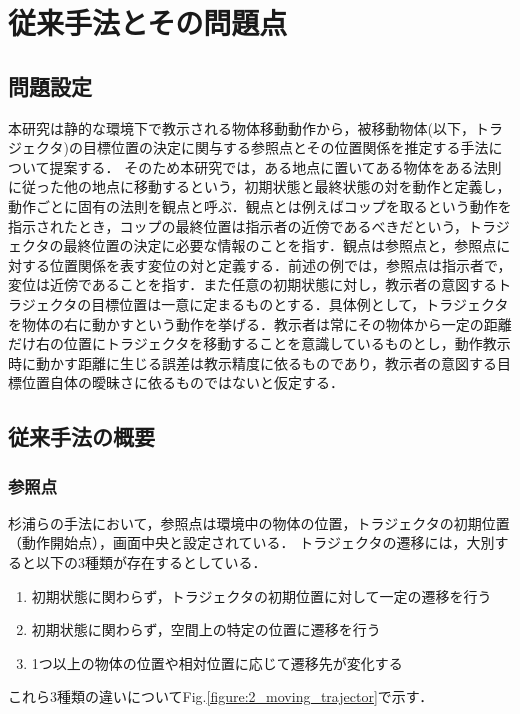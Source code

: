 ﻿%
\chapter{従来手法とその問題点}

\section{問題設定}

本研究は静的な環境下で教示される物体移動動作から，被移動物体(以下，トラジェクタ)の目標位置の決定に関与する参照点とその位置関係を推定する手法について提案する．
そのため本研究では，ある地点に置いてある物体をある法則に従った他の地点に移動するという，初期状態と最終状態の対を動作と定義し，動作ごとに固有の法則を観点と呼ぶ．観点とは例えばコップを取るという動作を指示されたとき，コップの最終位置は指示者の近傍であるべきだという，トラジェクタの最終位置の決定に必要な情報のことを指す．観点は参照点と，参照点に対する位置関係を表す変位の対と定義する．前述の例では，参照点は指示者で，変位は近傍であることを指す．また任意の初期状態に対し，教示者の意図するトラジェクタの目標位置は一意に定まるものとする．具体例として，トラジェクタを物体の右に動かすという動作を挙げる．教示者は常にその物体から一定の距離だけ右の位置にトラジェクタを移動することを意識しているものとし，動作教示時に動かす距離に生じる誤差は教示精度に依るものであり，教示者の意図する目標位置自体の曖昧さに依るものではないと仮定する．

\section{従来手法の概要}

\subsection{参照点}

杉浦ら\cite{sugiura}の手法において，参照点は環境中の物体の位置，トラジェクタの初期位置（動作開始点），画面中央と設定されている．
トラジェクタの遷移には，大別すると以下の3種類が存在するとしている．

	\begin{enumerate}
		\item 初期状態に関わらず，トラジェクタの初期位置に対して一定の遷移を行う
		\item 初期状態に関わらず，空間上の特定の位置に遷移を行う
		\item 1つ以上の物体の位置や相対位置に応じて遷移先が変化する
	\end{enumerate}
これら3種類の違いについてFig.\ref{figure:2_moving_trajector}で示す．

